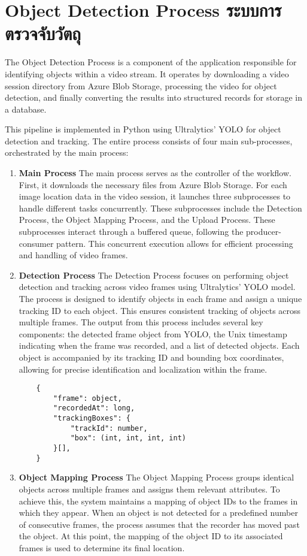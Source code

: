 \section{\ifenglish Object Detection Process \else ระบบการตรวจจับวัตถุ \fi}
The Object Detection Process is a component of the application responsible for identifying objects within a video stream. It operates by downloading a video session directory from Azure Blob Storage, processing the video for object detection, and finally converting the results into structured records for storage in a database. 

This pipeline is implemented in Python using Ultralytics' YOLO for object detection and tracking. The entire process consists of four main sub-processes, orchestrated by the main process:
\begin{enumerate}
    \item\textbf{Main Process}
    The main process serves as the controller of the workflow. First, it downloads the necessary files from Azure Blob Storage. For each image location data in the video session, it launches three subprocesses to handle different tasks concurrently. These subprocesses include the Detection Process, the Object Mapping Process, and the Upload Process. These subprocesses interact through a buffered queue, following the producer-consumer pattern. This concurrent execution allows for efficient processing and handling of video frames.

    \item\textbf{Detection Process}
    The Detection Process focuses on performing object detection and tracking across video frames using Ultralytics' YOLO model. The process is designed to identify objects in each frame and assign a unique tracking ID to each object. This ensures consistent tracking of objects across multiple frames. The output from this process includes several key components: the detected frame object from YOLO, the Unix timestamp indicating when the frame was recorded, and a list of detected objects. Each object is accompanied by its tracking ID and bounding box coordinates, allowing for precise identification and localization within the frame.
    \begin{lstlisting}
    {
        "frame": object,
        "recordedAt": long,
        "trackingBoxes": {
            "trackId": number, 
            "box": (int, int, int, int) 
        }[],
    }
    \end{lstlisting}

    \item\textbf{Object Mapping Process}
    The Object Mapping Process groups identical objects across multiple frames and assigns them relevant attributes. To achieve this, the system maintains a mapping of object IDs to the frames in which they appear. When an object is not detected for a predefined number of consecutive frames, the process assumes that the recorder has moved past the object. At this point, the mapping of the object ID to its associated frames is used to determine its final location.


\end{enumerate}
